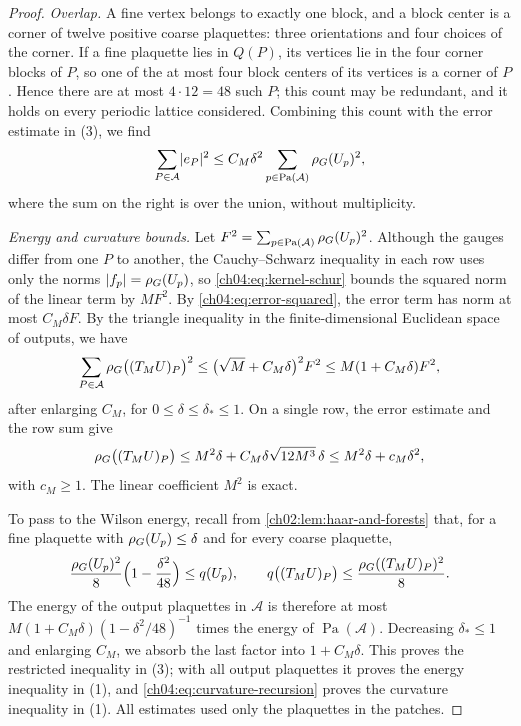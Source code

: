 \begin{proof}
\emph{Overlap.} A fine vertex belongs to exactly one block, and a block center is a corner of twelve positive coarse plaquettes: three orientations and four choices of the corner. If a fine plaquette lies in $Q(P)$, its vertices lie in the four corner blocks of $P$, so one of the at most four block centers of its vertices is a corner of $P$. Hence there are at most $4\cdot12=48$ such $P$; this count may be redundant, and it holds on every periodic lattice considered. Combining this count with the error estimate in (3), we find
\begin{equation}\label{ch04:eq:error-squared}
 \sum_{P\in\mathcal A}\lvert e_P\rvert^2\le C_M\delta^2\sum_{p\in\operatorname{Pa}(\mathcal A)}\rho_G(U_p)^2,
\end{equation}
where the sum on the right is over the union, without multiplicity.

\emph{Energy and curvature bounds.} Let $F^2=\sum_{p\in\operatorname{Pa}(\mathcal A)}\rho_G(U_p)^2$. Although the gauges differ from one $P$ to another, the Cauchy--Schwarz inequality in each row uses only the norms $\lvert f_p\rvert=\rho_G(U_p)$, so \eqref{ch04:eq:kernel-schur} bounds the squared norm of the linear term by $MF^2$. By \eqref{ch04:eq:error-squared}, the error term has norm at most $C_M\delta F$. By the triangle inequality in the finite-dimensional Euclidean space of outputs, we have
\begin{equation}\label{ch04:eq:curl-near-contraction}
 \sum_{P\in\mathcal A}\rho_G\bigl((T_MU)_P\bigr)^2\le\bigl(\sqrt M+C_M\delta\bigr)^2F^2\le M(1+C_M\delta)F^2,
\end{equation}
after enlarging $C_M$, for $0\le\delta\le\delta_*\le1$. On a single row, the error estimate and the row sum give
\begin{equation}\label{ch04:eq:curvature-recursion}
 \rho_G\bigl((T_MU)_P\bigr)\le M^2\delta+C_M\delta\sqrt{12M^3}\,\delta\le M^2\delta+c_M\delta^2,
\end{equation}
with $c_M\ge1$. The linear coefficient $M^2$ is exact.

To pass to the Wilson energy, recall from \cref{ch02:lem:haar-and-forests} that, for a fine plaquette with $\rho_G(U_p)\le\delta$ and for every coarse plaquette,
\[
 \frac{\rho_G(U_p)^2}8\Bigl(1-\frac{\delta^2}{48}\Bigr)\le q(U_p),\qquad q\bigl((T_MU)_P\bigr)\le\frac{\rho_G((T_MU)_P)^2}8.
\]
The energy of the output plaquettes in $\mathcal A$ is therefore at most $M(1+C_M\delta)(1-\delta^2/48)^{-1}$ times the energy of $\operatorname{Pa}(\mathcal A)$. Decreasing $\delta_*\le1$ and enlarging $C_M$, we absorb the last factor into $1+C_M\delta$. This proves the restricted inequality in (3); with all output plaquettes it proves the energy inequality in (1), and \eqref{ch04:eq:curvature-recursion} proves the curvature inequality in (1). All estimates used only the plaquettes in the patches.


\end{proof}
